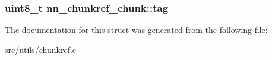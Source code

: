 \subsubsection[{tag}]{\setlength{\rightskip}{0pt plus 5cm}uint8\+\_\+t nn\+\_\+chunkref\+\_\+chunk\+::tag}\hypertarget{structnn__chunkref__chunk_abebb831eac6444be41bc134715a334b1}{}\label{structnn__chunkref__chunk_abebb831eac6444be41bc134715a334b1}


The documentation for this struct was generated from the following file\+:\begin{DoxyCompactItemize}
\item 
src/utils/\hyperlink{chunkref_8c}{chunkref.\+c}\end{DoxyCompactItemize}
